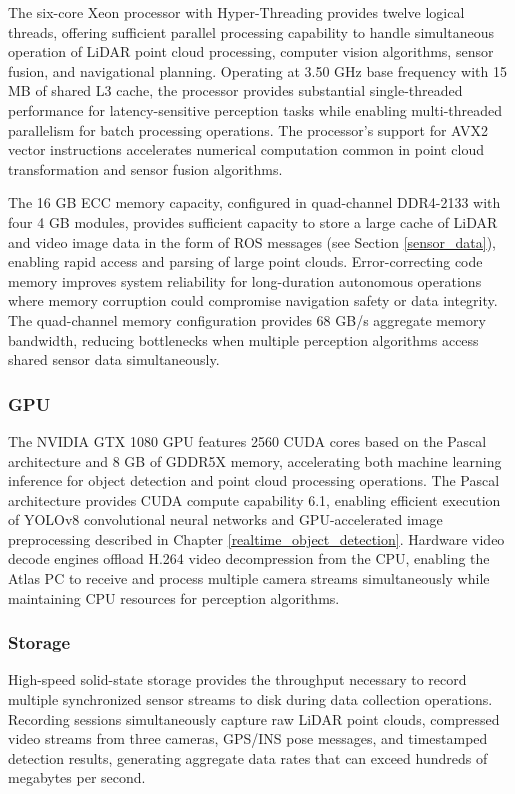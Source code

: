 The six-core Xeon processor with Hyper-Threading provides twelve logical threads, offering sufficient parallel processing capability to handle simultaneous operation of LiDAR point cloud processing, computer vision algorithms, sensor fusion, and navigational planning.
Operating at 3.50 GHz base frequency with 15 MB of shared L3 cache, the processor provides substantial single-threaded performance for latency-sensitive perception tasks while enabling multi-threaded parallelism for batch processing operations.
The processor's support for AVX2 vector instructions accelerates numerical computation common in point cloud transformation and sensor fusion algorithms.

The 16 GB ECC memory capacity, configured in quad-channel DDR4-2133 with four 4 GB modules, provides sufficient capacity to store a large cache of LiDAR and video image data in the form of \ac{ROS} messages (see Section \ref{sensor_data}), enabling rapid access and parsing of large point clouds.%
Error-correcting code memory improves system reliability for long-duration autonomous operations where memory corruption could compromise navigation safety or data integrity.
The quad-channel memory configuration provides 68 GB/s aggregate memory bandwidth, reducing bottlenecks when multiple perception algorithms access shared sensor data simultaneously.

\subsubsection{GPU}
The NVIDIA GTX 1080 GPU features 2560 CUDA cores based on the Pascal architecture and 8 GB of GDDR5X memory, accelerating both machine learning inference for object detection and point cloud processing operations.
The Pascal architecture provides CUDA compute capability 6.1, enabling efficient execution of YOLOv8 convolutional neural networks and GPU-accelerated image preprocessing described in Chapter \ref{realtime_object_detection}.
Hardware video decode engines offload H.264 video decompression from the CPU, enabling the Atlas PC to receive and process multiple camera streams simultaneously while maintaining CPU resources for perception algorithms.

\subsubsection{Storage}
High-speed solid-state storage provides the throughput necessary to record multiple synchronized sensor streams to disk during data collection operations.
Recording sessions simultaneously capture raw LiDAR point clouds, compressed video streams from three cameras, GPS/INS pose messages, and timestamped detection results, generating aggregate data rates that can exceed hundreds of megabytes per second.

